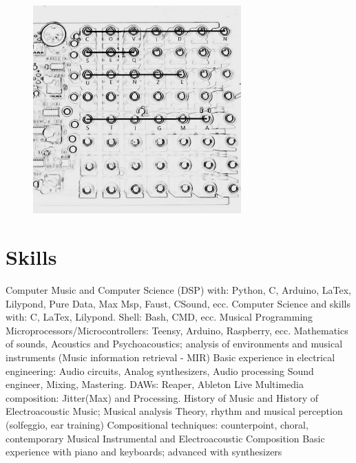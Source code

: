 \documentclass[12pt,landscape]{article}
\begin{document}
{\begin{center}
\begin{figure}[!htb]
\endminipage\hfill
{}%
  \includegraphics[width=8cm]{covidnsequenze.jpg}

\endminipage
\end{figure}

\clearpage


\section*{Skills}

Computer Music and Computer Science (DSP) with: Python, C, Arduino, LaTex, Lilypond, Pure Data,
Max Msp, Faust, CSound, ecc.
\newline
Computer Science and skills with: C, LaTex, Lilypond. Shell: Bash, CMD, ecc.
\newline
Musical Programming Microprocessors/Microcontrollers: Teensy, Arduino, Raspberry, ecc.
\newline
Mathematics of sounds, Acoustics and Psychoacoustics; analysis of environments and musical instruments
(Music information retrieval - MIR)
\newline
Basic experience in electrical engineering: Audio circuits, Analog synthesizers, Audio processing
\newline
Sound engineer, Mixing, Mastering. DAWs: Reaper, Ableton Live
\newline
Multimedia composition: Jitter(Max) and Processing.
\newline
History of Music and History of Electroacoustic Music; Musical analysis
\newline
Theory, rhythm and musical perception (solfeggio, ear training)
\newline
Compositional techniques: counterpoint, choral, contemporary
\newline
Musical Instrumental and Electroacoustic Composition
\newline
Basic experience with piano and keyboards; advanced with synthesizers


\end{center}}
\end{document}
